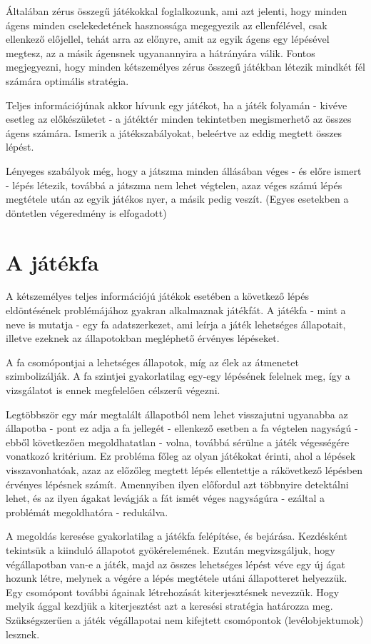 Általában zérus összegű játékokkal foglalkozunk, ami azt jelenti, hogy minden ágens minden cselekedetének hasznossága megegyezik az ellenfélével, csak ellenkező előjellel, tehát arra az előnyre, amit az egyik ágens egy lépésével megtesz, az a másik ágensnek ugyanannyira a hátrányára válik. Fontos megjegyezni, hogy minden kétszemélyes zérus összegű játékban létezik mindkét fél számára optimális stratégia.\ujsor

Teljes információjúnak akkor hívunk egy játékot, ha a játék folyamán - kivéve esetleg az előkészületet - a játéktér minden tekintetben megismerhető az összes ágens számára. Ismerik a játékszabályokat, beleértve az eddig megtett összes lépést.\ujsor

Lényeges szabályok még, hogy a játszma minden állásában véges - és előre ismert - lépés létezik, továbbá a játszma nem lehet végtelen, azaz véges számú lépés megtétele után az egyik játékos nyer, a másik pedig veszít. (Egyes esetekben a döntetlen végeredmény is elfogadott)

\section{A játékfa}
A kétszemélyes teljes információjú játékok esetében a következő lépés eldöntésének problémájához gyakran alkalmaznak játékfát. A játékfa - mint a neve is mutatja - egy fa adatszerkezet, ami leírja a játék lehetséges állapotait, illetve ezeknek az állapotokban megléphető érvényes lépéseket.\ujsor

A fa csomópontjai a lehetséges állapotok, míg az élek az átmenetet szimbolizálják. A fa szintjei gyakorlatilag egy-egy lépésének felelnek meg, így a vizsgálatot is ennek megfelelően célszerű végezni.\ujsor

Legtöbbször egy már megtalált állapotból nem lehet visszajutni ugyanabba az állapotba - pont ez adja a fa jellegét - ellenkező esetben a fa végtelen nagyságú - ebből következően megoldhatatlan - volna, továbbá sérülne a játék végességére vonatkozó kritérium. Ez probléma főleg az olyan játékokat érinti, ahol a lépések visszavonhatóak, azaz az előzőleg megtett lépés ellentettje a rákövetkező lépésben érvényes lépésnek számít. Amennyiben ilyen előfordul azt többnyire detektálni lehet, és az ilyen ágakat levágják a fát ismét véges nagyságúra - ezáltal a problémát megoldhatóra - redukálva.\ujsor

A megoldás keresése gyakorlatilag a játékfa felépítése, és bejárása. Kezdésként tekintsük a kiinduló állapotot gyökérelemének. Ezután  megvizsgáljuk, hogy végállapotban van-e a játék, majd az összes lehetséges lépést véve egy új ágat hozunk létre, melynek a végére a lépés megtétele utáni állapotteret helyezzük. Egy csomópont további ágainak létrehozását kiterjesztésnek nevezzük. Hogy melyik ággal kezdjük a kiterjesztést azt a keresési stratégia határozza meg. Szükségszerűen a játék végállapotai nem kifejtett csomópontok (levélobjektumok) lesznek.\ujsor


